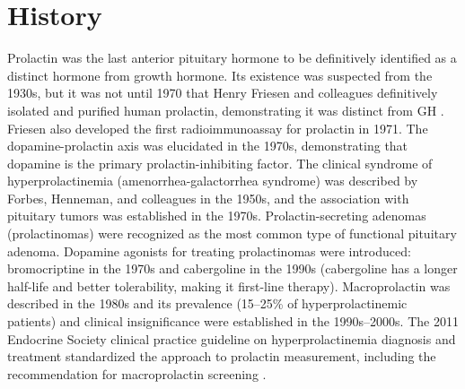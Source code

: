 \section*{History}
Prolactin was the last anterior pituitary hormone to be definitively identified as a distinct hormone from growth hormone. Its existence was suspected from the 1930s, but it was not until 1970 that Henry Friesen and colleagues definitively isolated and purified human prolactin, demonstrating it was distinct from GH \cite{friesen1970biosynthesis}. Friesen also developed the first radioimmunoassay for prolactin in 1971. The dopamine-prolactin axis was elucidated in the 1970s, demonstrating that dopamine is the primary prolactin-inhibiting factor. The clinical syndrome of hyperprolactinemia (amenorrhea-galactorrhea syndrome) was described by Forbes, Henneman, and colleagues in the 1950s, and the association with pituitary tumors was established in the 1970s. Prolactin-secreting adenomas (prolactinomas) were recognized as the most common type of functional pituitary adenoma. Dopamine agonists for treating prolactinomas were introduced: bromocriptine in the 1970s and cabergoline in the 1990s (cabergoline has a longer half-life and better tolerability, making it first-line therapy). Macroprolactin was described in the 1980s and its prevalence (15--25\% of hyperprolactinemic patients) and clinical insignificance were established in the 1990s--2000s. The 2011 Endocrine Society clinical practice guideline on hyperprolactinemia diagnosis and treatment standardized the approach to prolactin measurement, including the recommendation for macroprolactin screening \cite{melmed2011diagnosis}.

